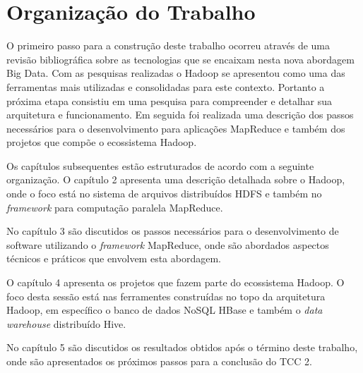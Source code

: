  
\section{Organização do Trabalho}
 
O primeiro passo para a construção deste trabalho ocorreu através de uma revisão bibliográfica sobre as tecnologias que se encaixam nesta nova abordagem Big Data. Com as pesquisas realizadas o Hadoop se apresentou como uma das ferramentas mais utilizadas e consolidadas para este contexto. Portanto a próxima etapa consistiu em uma pesquisa para compreender e detalhar sua arquitetura e funcionamento. Em seguida foi realizada uma descrição dos passos necessários para o desenvolvimento para aplicações MapReduce e também dos projetos que compõe o ecossistema Hadoop.

Os capítulos subsequentes estão estruturados de acordo com a seguinte organização. O capítulo 2 apresenta uma descrição detalhada sobre o Hadoop, onde o foco está no sistema de arquivos distribuídos HDFS e também no \textit{framework} para computação paralela MapReduce. 

No capítulo 3 são discutidos os passos necessários para o desenvolvimento de software utilizando o \textit{framework} MapReduce, onde são abordados aspectos técnicos e práticos que envolvem esta abordagem.

O capítulo 4 apresenta os projetos que fazem parte do ecossistema Hadoop. O foco desta sessão está nas ferramentes construídas no topo da arquitetura Hadoop, em específico o banco de dados NoSQL HBase e também o \textit{data warehouse} distribuído Hive.

No capítulo 5 são discutidos os resultados obtidos após o término deste trabalho, onde são apresentados os próximos passos para a conclusão do TCC 2.


